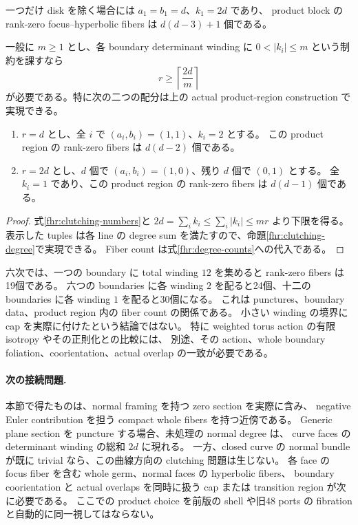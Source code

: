 \begin{corollary}\label{fhr:charge-tradeoff}
一つだけ disk を除く場合には $a_1=b_1=d$、$k_1=2d$ であり、
product block の rank-zero focus--hyperbolic fibers は $d(d-3)+1$ 個である。

一般に $m\ge1$ とし、各 boundary determinant winding に
$0<|k_i|\le m$ という制約を課すなら
\begin{equation}\label{fhr:charge-bound}
 r\ge\left\lceil\frac{2d}{m}\right\rceil
\end{equation}
が必要である。特に次の二つの配分は上の actual product-region construction で実現できる。
\begin{enumerate}
\item $r=d$ とし、全 $i$ で $(a_i,b_i)=(1,1)$、$k_i=2$ とする。
この product region の rank-zero fibers は $d(d-2)$ 個である。
\item $r=2d$ とし、$d$ 個で $(a_i,b_i)=(1,0)$、残り $d$ 個で $(0,1)$ とする。
全 $k_i=1$ であり、この product region の rank-zero fibers は $d(d-1)$ 個である。
\end{enumerate}
\end{corollary}

\begin{proof}
式\eqref{fhr:clutching-numbers}と
$2d=\sum_i k_i\le\sum_i|k_i|\le mr$ より下限を得る。
表示した tuples は各 line の degree sum を満たすので、命題\ref{fhr:clutching-degree}で実現できる。
Fiber count は式\eqref{fhr:degree-counts}への代入である。
\end{proof}

六次では、一つの boundary に total winding $12$ を集めると rank-zero fibers は19個である。
六つの boundaries に各 winding $2$ を配ると24個、十二の boundaries に各 winding $1$ を配ると30個になる。
これは punctures、boundary data、product region 内の fiber count の関係である。
小さい winding の境界に cap を実際に付けたという結論ではない。
特に weighted torus action の有限 isotropy やその正則化との比較には、
別途、その action、whole boundary foliation、coorientation、actual overlap の一致が必要である。

\paragraph{次の接続問題.}
本節で得たものは、normal framing を持つ zero section を実際に含み、
negative Euler contribution を担う compact whole fibers を持つ近傍である。
Generic plane section を puncture する場合、未処理の normal degree は、
curve faces の determinant winding の総和 $2d$ に現れる。
一方、closed curve の normal bundle が既に trivial なら、この曲線方向の clutching 問題は生じない。
各 face の focus fiber を含む whole germ、normal faces の hyperbolic fibers、
boundary coorientation と actual overlaps を同時に扱う cap または transition region が次に必要である。
ここでの product choice を前版の shell や旧48 ports の fibration と自動的に同一視してはならない。
